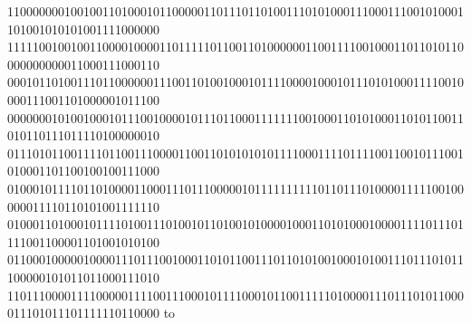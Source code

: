 \documentclass[10pt,\tflang,pdftex]{book}
\begin{document}
{{\begin{minipage}{\oldpwidth}
{{{{110000000100100110100010110000011011101101001110101000111000111001010001101001010101001111000000\blue\\
111110010010011000010000110111110110011010000001100111100100011011010110000000000011000111000110\blue\\
000101101001110110000001110011010010001011110000100010111010100011110010000111001101000001011100\blue\\
000000010100100010111001000010111011000111111100100011010100011010110011010110111011110100000010\blue\\
011101011001111011001110000110011010101010111100011110111100110010111001010001101100100100111000\blue\\
010001011110110100001100011101110000010111111111101101110100001111100100000011110110101001111110\blue\\
010001101000101111010011101001011010010100001000110101000100001111011101111001100001101001010100\blue\\
011000100000100001110111001000110101100111011010100100010100111011101011100000101011011000111010\blue\\
110111000011110000011110011100010111100010110011111010000111011101011000011101011101111110110000\blue
}}}}\fi
\vbox to
\end{minipage}}}
\end{document}
